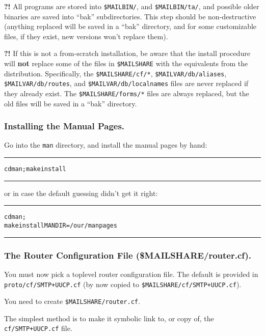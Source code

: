 {\bf\Large ?!}
All programs are stored into  {\tt \$MAILBIN/}, and {\tt \$MAILBIN/ta/}, and
possible older binaries are saved into ``bak'' subdirectories.
This step should be non-destructive (anything replaced will be
saved in a ``bak'' directory, and {\sf for some customizable files, if
they exist, new versions won't replace them}).

{\bf\Large ?!}{\sloppy
If this is not a from-scratch installation, be aware that the install
procedure will {\bf not} replace some of the files in {\tt \$MAILSHARE}
with the equivalents from the distribution.
Specifically, the {\tt \$MAILSHARE/cf/*}, {\tt \$MAILVAR/db/aliases},
{\tt \$MAILVAR/db/routes}, and {\tt \$MAILVAR/db/localnames} files are
never replaced if they already exist.
The {\tt \$MAILSHARE/forms/*} files are always replaced, but the
old files will be saved in a ``bak'' directory.
}



\subsubsection{Installing the Manual Pages.}%
%

Go into the {\tt man} directory, and install the manual pages by hand:
\nopagebreak
\begin{alltt}\medskip\hrule\medskip
  cd man ; make install
\medskip\hrule\end{alltt}\medskip

or in case the default guessing didn't get it right:
\nopagebreak
\begin{alltt}\medskip\hrule\medskip
  cd man ;
  make install MANDIR=/our/manpages
\medskip\hrule\end{alltt}\medskip


\subsubsection{The Router Configuration File (\$MAILSHARE/router.cf).}%
%

You must now pick a toplevel router configuration file.  The
default is provided in {\tt proto/cf/SMTP+UUCP.cf} (by now copied to
{\tt \$MAILSHARE/cf/SMTP+UUCP.cf}).

You need to create {\tt \$MAILSHARE/router.cf}.

The simplest method is to make it symbolic link to, or copy of,
the {\tt cf/SMTP+UUCP.cf} file.

